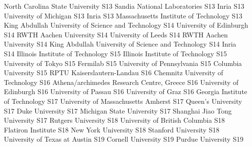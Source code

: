 \begin{multicols}{2}
{North Carolina State University}
{S13}
{}
{Sandia National Laboratories}
{S13}
{}
{Inria}
{S13}
{}
{University of Michigan}
{S13}
{}
{Inria}
{S13}
{}
{Massachusetts Institute of Technology}
{S13}
{}
{King Abdullah University of Science and Technology}
{S14}
{}
{University of Edinburgh}
{S14}
{}
{RWTH Aachen University}
{S14}
{}
{University of Leeds}
{S14}
{}
{RWTH Aachen University}
{S14}
{}
{King Abdullah University of Science and Technology}
{S14}
{}
{Inria}
{S14}
{}
{Illinois Institute of Technology}
{S15}
{}
{Illinois Institute of Technology}
{S15}
{}
{University of Tokyo}
{S15}
{}
{Fermilab}
{S15}
{}
{University of Pennsylvania}
{S15}
{}
{Columbia University}
{S15}
{}
{RPTU Kaiserslautern-Landau}
{S16}
{}
{Chemnitz University of Technology}
{S16}
{}
{Athena/archimedes Research Centre, Greece}
{S16}
{}
{University of Edinburgh}
{S16}
{}
{University of Passau}
{S16}
{}
{University of Graz}
{S16}
{}
{Georgia Institute of Technology}
{S17}
{}
{University of Massachusetts Amherst}
{S17}
{}
{Queen's University}
{S17}
{}
{Duke University}
{S17}
{}
{Michigan State University}
{S17}
{}
{Shanghai Jiao Tong University}
{S17}
{}
{Rutgers University}
{S18}
{}
{University of British Columbia}
{S18}
{}
{Flatiron Institute}
{S18}
{}
{New York University}
{S18}
{}
{Stanford University}
{S18}
{}
{University of Texas at Austin}
{S19}
{}
{Cornell University}
{S19}
{}
{Purdue University}
{S19}
{}

\end{multicols}
